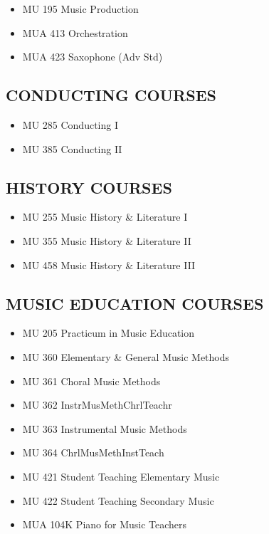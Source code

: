 \documentclass[
  letterpaper,
]{scrbook}
\providecommand{\tightlist}{%
  \setlength{\itemsep}{0pt}\setlength{\parskip}{0pt}}
\begin{document}
\begin{itemize}
\tightlist
\item
  MU 195 Music Production
\item
  MUA 413 Orchestration
\item
  MUA 423 Saxophone (Adv Std)
\end{itemize}

\subsection{CONDUCTING COURSES}\label{conducting-courses}

\begin{itemize}
\tightlist
\item
  MU 285 Conducting I
\item
  MU 385 Conducting II
\end{itemize}

\subsection{HISTORY COURSES}\label{history-courses}

\begin{itemize}
\tightlist
\item
  MU 255 Music History \& Literature I
\item
  MU 355 Music History \& Literature II
\item
  MU 458 Music History \& Literature III
\end{itemize}

\subsection{MUSIC EDUCATION COURSES}\label{music-education-courses}

\begin{itemize}
\tightlist
\item
  MU 205 Practicum in Music Education
\item
  MU 360 Elementary \& General Music Methods
\item
  MU 361 Choral Music Methods
\item
  MU 362 InstrMusMethChrlTeachr
\item
  MU 363 Instrumental Music Methods
\item
  MU 364 ChrlMusMethInstTeach
\item
  MU 421 Student Teaching Elementary Music
\item
  MU 422 Student Teaching Secondary Music
\item
  MUA 104K Piano for Music Teachers
\end{itemize}
\end{document}
